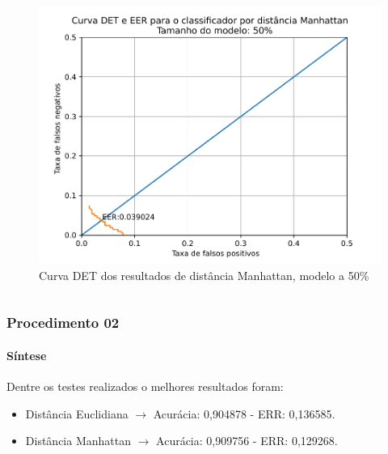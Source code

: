 \begin{frame}
{\begin{columns}
			\begin{figure}
				\centering
				\includegraphics[width=\linewidth]{../monography/images/results/det/DET_for_classifier_Manhattan_50}
				\caption{Curva DET dos resultados de distância Manhattan, modelo a 50\%}
			\end{figure}
		\end{columns}
	}
\end{frame}

\begin{frame}
	\frametitle{Procedimento 02}
		\framesubtitle{Síntese}
		\par Dentre os testes realizados o melhores resultados foram:
		\begin{itemize}
			\item Distância Euclidiana $\rightarrow$ Acurácia: 0,904878 - ERR: 0,136585.
			\item Distância Manhattan $\rightarrow$ Acurácia: 0,909756 - ERR: 0,129268.
		\end{itemize}
\end{frame}